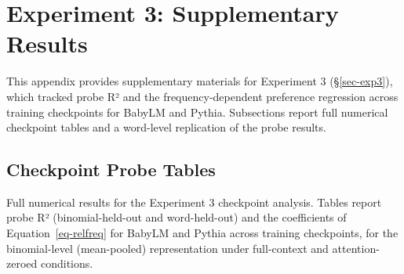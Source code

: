 \documentclass[11pt]{article}
\begin{document}
\endgroup{}

\newpage

\section{Experiment 3: Supplementary Results}\label{sec-appendix-exp3}

This appendix provides supplementary materials for Experiment 3
(§\ref{sec-exp3}), which tracked probe R² and the frequency-dependent
preference regression across training checkpoints for BabyLM and Pythia.
Subsections report full numerical checkpoint tables and a word-level
replication of the probe results.

\subsection{Checkpoint Probe Tables}\label{sec-appendix-ckpt-tables}

Full numerical results for the Experiment 3 checkpoint analysis. Tables
report probe R² (binomial-held-out and word-held-out) and the
coefficients of Equation~\ref{eq-relfreq} for BabyLM and Pythia across
training checkpoints, for the binomial-level (mean-pooled)
representation under full-context and attention-zeroed conditions.

\begingroup\fontsize{8}{10}\selectfont
\end{document}
